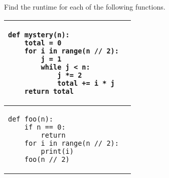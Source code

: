 \begin{blocksection}
\question Find the runtime for each of the following functions. \\

\begin{center}
\begin{tabular}{ |p{13cm}|p{2cm}| }
\hline
\begin{lstlisting}
def mystery(n):
    total = 0
    for i in range(n // 2):
        j = 1
        while j < n:
            j *= 2
            total += i * j
    return total
\end{lstlisting} &  \\  \hline

\begin{lstlisting}
def foo(n):
    if n == 0:
        return
    for i in range(n // 2):
        print(i)
    foo(n // 2)
\end{lstlisting} &  \\  \hline
\end{tabular}
\end{center}

\end{blocksection}

